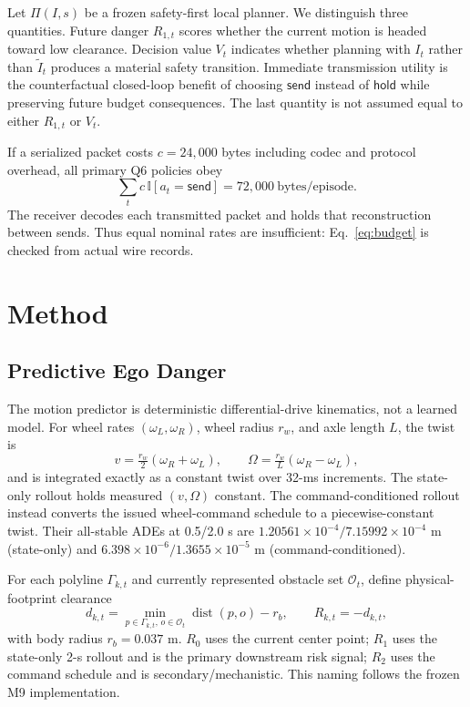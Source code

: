 \documentclass[letterpaper,10pt,conference]{ieeeconf}
\newcommand{\send}{\mathsf{send}}
\newcommand{\hold}{\mathsf{hold}}
\begin{document}
Let $\Pi(I,s)$ be a frozen safety-first local planner. We distinguish three
quantities. Future danger $R_{1,t}$ scores whether the current motion is headed
toward low clearance. Decision value $V_t$ indicates whether planning with
$I_t$ rather than $\tilde I_t$ produces a material safety transition. Immediate
transmission utility is the counterfactual closed-loop benefit of choosing
$\send$ instead of $\hold$ while preserving future budget consequences. The
last quantity is not assumed equal to either $R_{1,t}$ or $V_t$.

If a serialized packet costs $c=24{,}000$ bytes including codec and protocol
overhead, all primary Q6 policies obey
\begin{equation}
\sum_t c\,\mathbb I[a_t=\send]=72{,}000~\text{bytes/episode}.
\label{eq:budget}
\end{equation}
The receiver decodes each transmitted packet and holds that reconstruction
between sends. Thus equal nominal rates are insufficient: Eq.~\eqref{eq:budget}
is checked from actual wire records.

\section{Method}

\subsection{Predictive Ego Danger}
The motion predictor is deterministic differential-drive kinematics, not a
learned model. For wheel rates $(\omega_L,\omega_R)$, wheel radius $r_w$, and
axle length $L$, the twist is
\begin{equation}
v=\tfrac{r_w}{2}(\omega_R+\omega_L),\qquad
\Omega=\tfrac{r_w}{L}(\omega_R-\omega_L),
\end{equation}
and is integrated exactly as a constant twist over 32-ms increments. The
state-only rollout holds measured $(v,\Omega)$ constant. The
command-conditioned rollout instead converts the issued wheel-command schedule
to a piecewise-constant twist. Their all-stable ADEs at 0.5/2.0 s are
$1.20561\!\times\!10^{-4}/7.15992\!\times\!10^{-4}$ m (state-only) and
$6.398\!\times\!10^{-6}/1.3655\!\times\!10^{-5}$ m
(command-conditioned).

For each polyline $\Gamma_{k,t}$ and currently represented obstacle set
$\mathcal O_t$, define physical-footprint clearance
\begin{equation}
d_{k,t}=\min_{p\in\Gamma_{k,t},\,o\in\mathcal O_t}
\operatorname{dist}(p,o)-r_b, \qquad R_{k,t}=-d_{k,t},
\label{eq:risk}
\end{equation}
with body radius $r_b=0.037$ m. $R_0$ uses the current center point;
$R_1$ uses the state-only 2-s rollout and is the primary downstream risk
signal; $R_2$ uses the command schedule and is secondary/mechanistic. This
naming follows the frozen M9 implementation.
\end{document}
